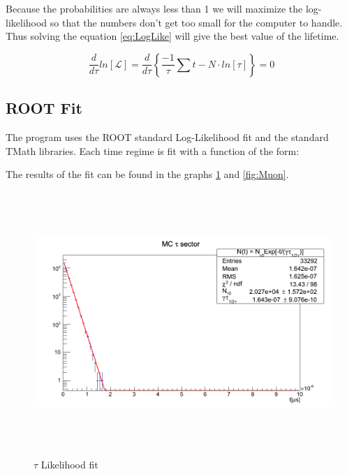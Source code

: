 \documentclass[aps,prl,groupedaddress]{revtex4}
\begin{document}
Because the probabilities are always less than 1 we will maximize the log-likelihood so that the numbers don't get too small for the computer to handle. Thus solving the equation \ref{eq:LogLike} will give the best value of the lifetime.

\begin{equation}
\label{eq:LogLike}
\frac{d}{d \tau} ln[\mathcal{L}] = \frac{d}{d \tau} \left\{ \frac{-1}{\tau} \sum t - N \cdot ln[\tau] \right\} = 0
\end{equation}

\subsection{ROOT Fit}
The program uses the ROOT standard Log-Likelihood fit and the standard TMath libraries. Each time regime is fit with a function of the form:

\par

The results of the fit can be found in the graphs \ref{fig:Tau} and \ref{fig:Muon}.

\begin{figure}[htp]
\centering
\includegraphics[height=100mm]{Tau_MC.png}
\caption{$\tau$ Likelihood fit}
\label{fig:Tau}
\end{figure}
\end{document}

